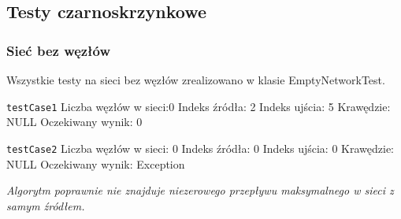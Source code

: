 \subsection{Testy czarno\dywiz skrzynkowe}



\subsubsection{Sieć bez węzłów}
Wszystkie testy na sieci bez węzłów zrealizowano w klasie EmptyNetworkTest.

\texttt{testCase1}
Liczba węzłów w sieci:0
Indeks źródła: 2
Indeks ujścia: 5
Krawędzie: NULL
Oczekiwany wynik: 0

\texttt{testCase2}
Liczba węzłów w sieci: 0
Indeks źródła: 0
Indeks ujścia: 0
Krawędzie: NULL
Oczekiwany wynik: Exception

\emph{Algorytm poprawnie nie znajduje niezerowego przepływu maksymalnego w sieci
z samym źródłem.}

